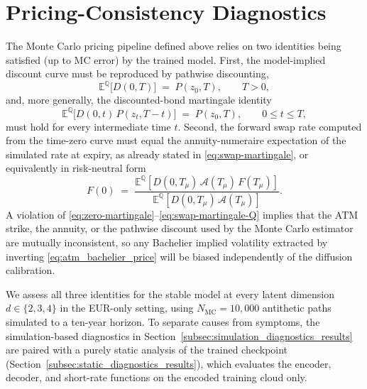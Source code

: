 
\section{Pricing-Consistency Diagnostics}
\label{sec:pricing_diagnostics}

The Monte Carlo pricing pipeline defined above relies on two identities being satisfied (up to MC error) by the trained model. First, the model-implied discount curve must be reproduced by pathwise discounting,
\begin{equation}
  \mathbb{E}^{\mathbb Q}\!\bigl[D(0,T)\bigr]
  \;=\;
  P(z_0, T),
  \qquad T>0,
  \label{eq:zero-martingale}
\end{equation}
and, more generally, the discounted-bond martingale identity
\begin{equation}
  \mathbb{E}^{\mathbb Q}\!\bigl[D(0,t)\,P(z_t, T-t)\bigr]
  \;=\;
  P(z_0, T),
  \qquad 0\le t\le T,
  \label{eq:bond-martingale}
\end{equation}
must hold for every intermediate time $t$. Second, the forward swap rate computed from the time-zero curve must equal the annuity-numeraire expectation of the simulated rate at expiry, as already stated in \eqref{eq:swap-martingale}, or equivalently in risk-neutral form
\begin{equation}
  F(0)
  \;=\;
  \frac{\mathbb{E}^{\mathbb Q}\!\left[D(0,T_\mu)\,\mathcal A(T_\mu)\,F(T_\mu)\right]}
       {\mathbb{E}^{\mathbb Q}\!\left[D(0,T_\mu)\,\mathcal A(T_\mu)\right]}.
  \label{eq:swap-martingale-Q}
\end{equation}
A violation of \eqref{eq:zero-martingale}--\eqref{eq:swap-martingale-Q} implies that the ATM strike, the annuity, or the pathwise discount used by the Monte Carlo estimator are mutually inconsistent, so any Bachelier implied volatility extracted by inverting \eqref{eq:atm_bachelier_price} will be biased independently of the diffusion calibration.

We assess all three identities for the stable model at every latent dimension $d\in\{2,3,4\}$ in the EUR-only setting, using \(N_{\mathrm{MC}}=10{,}000\) antithetic paths simulated to a ten-year horizon. To separate causes from symptoms, the simulation-based diagnostics in Section~\ref{subsec:simulation_diagnostics_results} are paired with a purely static analysis of the trained checkpoint (Section~\ref{subsec:static_diagnostics_results}), which evaluates the encoder, decoder, and short-rate functions on the encoded training cloud only.

